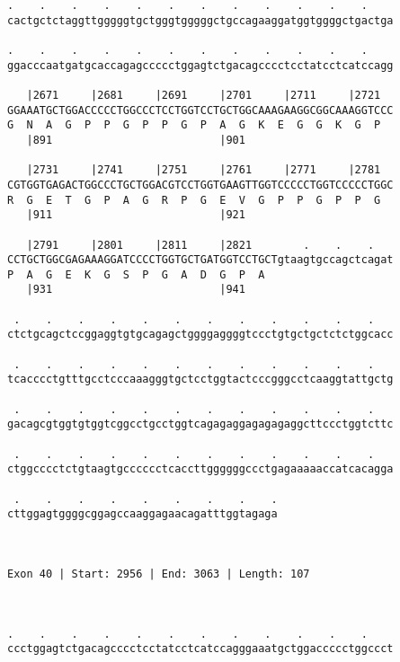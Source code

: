 \documentclass{article}
\begin{document}
\begin{Verbatim}
.    .    .    .    .    .    .    .    .    .    .    .    
cactgctctaggttgggggtgctgggtgggggctgccagaaggatggtggggctgactga
                                                            
.    .    .    .    .    .    .    .    .    .    .    .    
ggacccaatgatgcaccagagccccctggagtctgacagcccctcctatcctcatccagg
                                                            
   |2671     |2681     |2691     |2701     |2711     |2721  
GGAAATGCTGGACCCCCTGGCCCTCCTGGTCCTGCTGGCAAAGAAGGCGGCAAAGGTCCC
G  N  A  G  P  P  G  P  P  G  P  A  G  K  E  G  G  K  G  P  
   |891                          |901                       
  
   |2731     |2741     |2751     |2761     |2771     |2781  
CGTGGTGAGACTGGCCCTGCTGGACGTCCTGGTGAAGTTGGTCCCCCTGGTCCCCCTGGC
R  G  E  T  G  P  A  G  R  P  G  E  V  G  P  P  G  P  P  G  
   |911                          |921                       
  
   |2791     |2801     |2811     |2821        .    .    .   
CCTGCTGGCGAGAAAGGATCCCCTGGTGCTGATGGTCCTGCTgtaagtgccagctcagat
P  A  G  E  K  G  S  P  G  A  D  G  P  A                    
   |931                          |941                       
  
 .    .    .    .    .    .    .    .    .    .    .    .   
ctctgcagctccggaggtgtgcagagctggggaggggtccctgtgctgctctctggcacc
                                                            
 .    .    .    .    .    .    .    .    .    .    .    .   
tcacccctgtttgcctcccaaagggtgctcctggtactcccgggcctcaaggtattgctg
                                                            
 .    .    .    .    .    .    .    .    .    .    .    .   
gacagcgtggtgtggtcggcctgcctggtcagagaggagagagaggcttccctggtcttc
                                                            
 .    .    .    .    .    .    .    .    .    .    .    .   
ctggcccctctgtaagtgcccccctcaccttggggggccctgagaaaaaccatcacagga
                                                            
 .    .    .    .    .    .    .    .    .
cttggagtggggcggagccaaggagaacagatttggtagaga
                                          
                                          
 
Exon 40 | Start: 2956 | End: 3063 | Length: 107



.    .    .    .    .    .    .    .    .    .    .    .    
ccctggagtctgacagcccctcctatcctcatccagggaaatgctggaccccctggccct
                                                            

\end{Verbatim}
\end{document}
